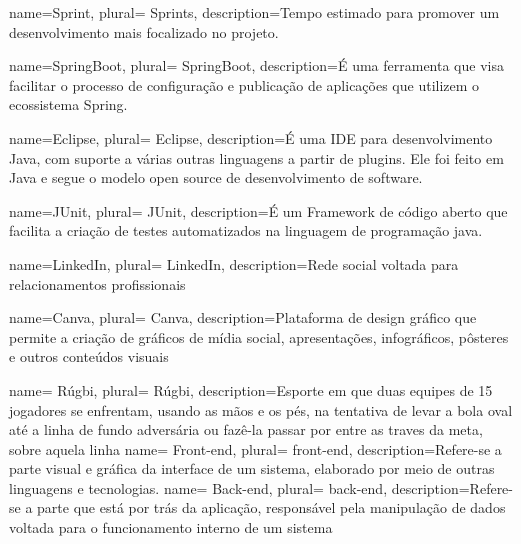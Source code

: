 


 {
    name=Sprint,
    plural= {Sprints},
    description={Tempo estimado para promover um desenvolvimento mais focalizado no projeto.}
}

 {
    name=SpringBoot,
    plural= {SpringBoot},
    description={É uma ferramenta que visa facilitar o processo de configuração e publicação de aplicações que utilizem o ecossistema Spring.}
}

 {
    name=Eclipse,
    plural= {Eclipse},
    description={É uma IDE para desenvolvimento Java, com suporte a várias outras linguagens a partir de plugins. Ele foi feito em Java e segue o modelo open source de desenvolvimento de software.}
}

 {
    name=JUnit,
    plural= {JUnit},
    description={É um Framework de código aberto que facilita a criação de testes automatizados na linguagem de programação java.}
}


 {
    name=LinkedIn,
    plural= {LinkedIn},
    description={Rede social voltada para relacionamentos profissionais}
}

 {
    name=Canva,
    plural= {Canva},
    description={Plataforma de design gráfico que permite a criação de gráficos de mídia social, apresentações, infográficos, pôsteres e outros conteúdos visuais}
}

 {
    name= R{\'u}gbi,
    plural= {R{\'u}gbi},
    description={Esporte em que duas equipes de 15 jogadores se enfrentam, usando as mãos e os pés, na tentativa de levar a bola oval at{\'e} a linha de fundo adversária ou faz{\^e}-la passar por entre as traves da meta, sobre aquela linha }
}
 {
    name= Front-end,
    plural= {front-end},
    description={Refere-se a parte visual e gráfica da interface de um sistema, elaborado por meio de outras linguagens e tecnologias.}
}
 {
    name= Back-end,
    plural= {back-end},
    description={Refere-se a parte que está por trás da aplicação, responsável pela manipulação de dados voltada para o funcionamento interno de um sistema}
}

